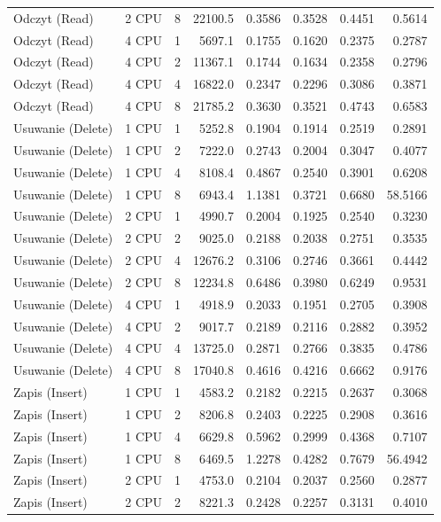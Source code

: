 \begin{table}[ht]
{\begin{tabular}{llcrrrrr}
Odczyt (Read) & 2 CPU & 8 & 22100.5 & 0.3586 & 0.3528 & 0.4451 & 0.5614 \\
Odczyt (Read) & 4 CPU & 1 & 5697.1 & 0.1755 & 0.1620 & 0.2375 & 0.2787 \\
Odczyt (Read) & 4 CPU & 2 & 11367.1 & 0.1744 & 0.1634 & 0.2358 & 0.2796 \\
Odczyt (Read) & 4 CPU & 4 & 16822.0 & 0.2347 & 0.2296 & 0.3086 & 0.3871 \\
Odczyt (Read) & 4 CPU & 8 & 21785.2 & 0.3630 & 0.3521 & 0.4743 & 0.6583 \\
Usuwanie (Delete) & 1 CPU & 1 & 5252.8 & 0.1904 & 0.1914 & 0.2519 & 0.2891 \\
Usuwanie (Delete) & 1 CPU & 2 & 7222.0 & 0.2743 & 0.2004 & 0.3047 & 0.4077 \\
Usuwanie (Delete) & 1 CPU & 4 & 8108.4 & 0.4867 & 0.2540 & 0.3901 & 0.6208 \\
Usuwanie (Delete) & 1 CPU & 8 & 6943.4 & 1.1381 & 0.3721 & 0.6680 & 58.5166 \\
Usuwanie (Delete) & 2 CPU & 1 & 4990.7 & 0.2004 & 0.1925 & 0.2540 & 0.3230 \\
Usuwanie (Delete) & 2 CPU & 2 & 9025.0 & 0.2188 & 0.2038 & 0.2751 & 0.3535 \\
Usuwanie (Delete) & 2 CPU & 4 & 12676.2 & 0.3106 & 0.2746 & 0.3661 & 0.4442 \\
Usuwanie (Delete) & 2 CPU & 8 & 12234.8 & 0.6486 & 0.3980 & 0.6249 & 0.9531 \\
Usuwanie (Delete) & 4 CPU & 1 & 4918.9 & 0.2033 & 0.1951 & 0.2705 & 0.3908 \\
Usuwanie (Delete) & 4 CPU & 2 & 9017.7 & 0.2189 & 0.2116 & 0.2882 & 0.3952 \\
Usuwanie (Delete) & 4 CPU & 4 & 13725.0 & 0.2871 & 0.2766 & 0.3835 & 0.4786 \\
Usuwanie (Delete) & 4 CPU & 8 & 17040.8 & 0.4616 & 0.4216 & 0.6662 & 0.9176 \\
Zapis (Insert) & 1 CPU & 1 & 4583.2 & 0.2182 & 0.2215 & 0.2637 & 0.3068 \\
Zapis (Insert) & 1 CPU & 2 & 8206.8 & 0.2403 & 0.2225 & 0.2908 & 0.3616 \\
Zapis (Insert) & 1 CPU & 4 & 6629.8 & 0.5962 & 0.2999 & 0.4368 & 0.7107 \\
Zapis (Insert) & 1 CPU & 8 & 6469.5 & 1.2278 & 0.4282 & 0.7679 & 56.4942 \\
Zapis (Insert) & 2 CPU & 1 & 4753.0 & 0.2104 & 0.2037 & 0.2560 & 0.2877 \\
Zapis (Insert) & 2 CPU & 2 & 8221.3 & 0.2428 & 0.2257 & 0.3131 & 0.4010 \\

\end{tabular}}
\end{table}
